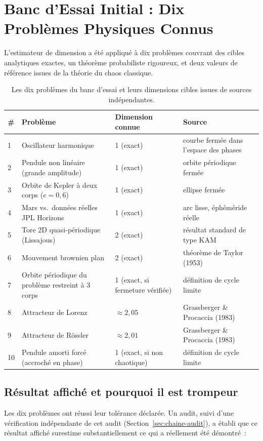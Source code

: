 \documentclass[11pt,a4paper]{article}
\begin{document}
\section{Banc d'Essai Initial : Dix Problèmes Physiques Connus}
\label{sec:resultats}

L'estimateur de dimension a été appliqué à dix problèmes couvrant des
cibles analytiques exactes, un théorème probabiliste rigoureux, et deux
valeurs de référence issues de la théorie du chaos classique.

\begin{table}[h]
\centering
\small
\begin{tabular}{@{}llll@{}}
\toprule
\# & Problème & Dimension connue & Source \\
\midrule
1 & Oscillateur harmonique & 1 (exact) & courbe fermée dans l'espace des phases \\
2 & Pendule non linéaire (grande amplitude) & 1 (exact) & orbite périodique fermée \\
3 & Orbite de Kepler à deux corps ($e=0,6$) & 1 (exact) & ellipse fermée \\
4 & Mars vs.\ données réelles JPL Horizons & 1 (exact) & arc lisse, éphéméride réelle \\
5 & Tore 2D quasi-périodique (Lissajous) & 2 (exact) & résultat standard de type KAM \\
6 & Mouvement brownien plan & 2 (exact) & théorème de Taylor (1953) \\
7 & Orbite périodique du problème restreint à 3 corps & 1 (exact, si fermeture vérifiée) & définition de cycle limite \\
8 & Attracteur de Lorenz & $\approx 2,05$ & Grassberger \& Procaccia (1983) \\
9 & Attracteur de R\"ossler & $\approx 2,01$ & Grassberger \& Procaccia (1983) \\
10 & Pendule amorti forcé (accroché en phase) & 1 (exact, si non chaotique) & définition de cycle limite \\
\bottomrule
\end{tabular}
\caption{Les dix problèmes du banc d'essai et leurs dimensions cibles issues de sources indépendantes.}
\end{table}

\subsection{Résultat affiché et pourquoi il est trompeur}

Les dix problèmes ont réussi leur tolérance déclarée. Un audit, suivi d'une
vérification indépendante de cet audit
(Section~\ref{sec:chaine-audit}), a établi que ce résultat affiché
surestime substantiellement ce qui a réellement été démontré~:
\end{document}
